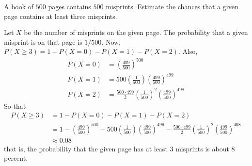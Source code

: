 





\begin{problem}[Handout 8, \# 13]
  A book of \(500\) pages contains \(500\) misprints. Estimate the chances
  that a given page contains at least three misprints.
\end{problem}
\begin{solution}
  Let $X$ be the number of misprints on the given page. The probability
  that a given misprint is on that page is $1/500$. Now,
  $P(X \geq 3) = 1- P(X=0) - P(X=1) - P(X=2)$. Also,
  \begin{align*}
    P(X=0) &= \left(\frac{499}{500}\right)^{500}\\
    P(X=1) &= 500\left(\frac{1}{500}\right)\left(\frac{499}{500}\right)^{499} \\
    P(X=2) &= \frac{500 \cdot 499}{2}\left(\frac{1}{500}\right)^2\left(\frac{499}{500}\right)^{498}
  \end{align*}
  So that
  \begin{align*}
    P(X \geq 3) &= 1- P(X=0) - P(X=1) - P(X=2)\\
                &= 1- \left(\frac{499}{500}\right)^{500} - 500\left(\frac{1}{500}\right)\left(\frac{499}{500}\right)^{499} - \frac{500 \cdot 499}{2}\left(\frac{1}{500}\right)^2\left(\frac{499}{500}\right)^{498}\\
                &\approx 0.08
  \end{align*}
  that is, the probability that the given page has at least \(3\) misprints
  is about \(8\) percent.
\end{solution}

